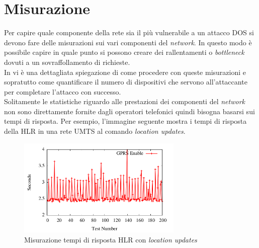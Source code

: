 \section{Misurazione}
Per capire quale componente della rete sia il più vulnerabile a un attacco DOS si devono fare delle misurazioni sui vari componenti del \textit{network}.
In questo modo è possibile capire in quale punto si possono creare dei rallentamenti o \textit{bottleneck} dovuti a un sovraffollamento di richieste.\\
In \cite{measuring-dos} vi è una dettagliata spiegazione di come procedere con queste misurazioni e sopratutto come quantificare il numero di dispositivi che 
servono all'attaccante per completare l'attacco con successo.\\
Solitamente le statistiche riguardo alle prestazioni dei componenti del \textit{network} non sono direttamente fornite dagli operatori telefonici quindi bisogna 
basarsi sui tempi di risposta. Per esempio, l'immagine seguente mostra i tempi di risposta della HLR in una rete UMTS al comando \textit{location updates}.
\begin{figure}[h]
    \centering
    \includegraphics[width=0.7\textwidth]{images/hlr-measuring.png}
    \caption{Misurazione tempi di risposta HLR con \textit{location updates}\cite{measuring-dos}}
\end{figure}